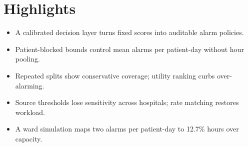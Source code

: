 \section*{Highlights}
\begin{itemize}
\item A calibrated decision layer turns fixed scores into auditable alarm policies.
\item Patient-blocked bounds control mean alarms per patient-day without hour pooling.
\item Repeated splits show conservative coverage; utility ranking curbs over-alarming.
\item Source thresholds lose sensitivity across hospitals; rate matching restores workload.
\item A ward simulation maps two alarms per patient-day to 12.7\% hours over capacity.
\end{itemize}
